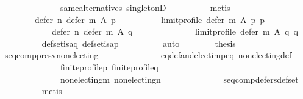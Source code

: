 \begin{isabellebody}
\ \ \ \ \ \ \ \ \ \ \ \ \ \ same{\isacharunderscore}{\kern0pt}alternatives\ singletonD\isanewline
\ \ \ \ \ \ \ \ \isamarkupfalse%
\ metis\isanewline
\ \ \ \ \ \ \isamarkupfalse%
\isanewline
\ \ \ \ \ \ \ \ {\isachardoublequoteopen}defer\ n\ {\isacharparenleft}{\kern0pt}defer\ m\ A\ p{\isacharparenright}{\kern0pt}\isanewline
\ \ \ \ \ \ \ \ \ \ {\isacharparenleft}{\kern0pt}limit{\isacharunderscore}{\kern0pt}profile\ {\isacharparenleft}{\kern0pt}defer\ m\ A\ p{\isacharparenright}{\kern0pt}\ p{\isacharparenright}{\kern0pt}\ {\isacharequal}{\kern0pt}\isanewline
\ \ \ \ \ \ \ \ \ \ \ \ defer\ n\ {\isacharparenleft}{\kern0pt}defer\ m\ A\ q{\isacharparenright}{\kern0pt}\isanewline
\ \ \ \ \ \ \ \ \ \ \ \ \ \ {\isacharparenleft}{\kern0pt}limit{\isacharunderscore}{\kern0pt}profile\ {\isacharparenleft}{\kern0pt}defer\ m\ A\ q{\isacharparenright}{\kern0pt}\ q{\isacharparenright}{\kern0pt}{\isachardoublequoteclose}\isanewline
\ \ \ \ \ \ \ \ \isamarkupfalse%
\ def{\isacharunderscore}{\kern0pt}set{\isacharunderscore}{\kern0pt}is{\isacharunderscore}{\kern0pt}a{\isacharunderscore}{\kern0pt}q\ def{\isacharunderscore}{\kern0pt}set{\isacharunderscore}{\kern0pt}is{\isacharunderscore}{\kern0pt}a{\isacharunderscore}{\kern0pt}p\isanewline
\ \ \ \ \ \ \ \ \isamarkupfalse%
\ auto\isanewline
\ \ \ \ \ \ \isamarkupfalse%
\ {\isacharquery}{\kern0pt}thesis\isanewline
\ \ \ \ \ \ \ \ \isamarkupfalse%
\ seq{\isacharunderscore}{\kern0pt}comp{\isacharunderscore}{\kern0pt}presv{\isacharunderscore}{\kern0pt}non{\isacharunderscore}{\kern0pt}electing\isanewline
\ \ \ \ \ \ \ \ \ \ \ \ \ \ eq{\isacharunderscore}{\kern0pt}def{\isacharunderscore}{\kern0pt}and{\isacharunderscore}{\kern0pt}elect{\isacharunderscore}{\kern0pt}imp{\isacharunderscore}{\kern0pt}eq\ non{\isacharunderscore}{\kern0pt}electing{\isacharunderscore}{\kern0pt}def\isanewline
\ \ \ \ \ \ \ \ \ \ \ \ \ \ finite{\isacharunderscore}{\kern0pt}profile{\isacharunderscore}{\kern0pt}p\ finite{\isacharunderscore}{\kern0pt}profile{\isacharunderscore}{\kern0pt}q\isanewline
\ \ \ \ \ \ \ \ \ \ \ \ \ \ non{\isacharunderscore}{\kern0pt}electing{\isacharunderscore}{\kern0pt}m\ non{\isacharunderscore}{\kern0pt}electing{\isacharunderscore}{\kern0pt}n\isanewline
\ \ \ \ \ \ \ \ \ \ \ \ \ \ seq{\isacharunderscore}{\kern0pt}comp{\isacharunderscore}{\kern0pt}defers{\isacharunderscore}{\kern0pt}def{\isacharunderscore}{\kern0pt}set\isanewline
\ \ \ \ \ \ \ \ \isamarkupfalse%
\ metis\isanewline
\ \ \ \ \isamarkupfalse%
\isanewline
\ \ \isamarkupfalse%
\isanewline
{}\isamarkupfalse%
%
\endisatagproof
{\isafoldproof}%
%
\isadelimproof
\isanewline
%
\endisadelimproof
%
\isadelimtheory
\isanewline
%
\endisadelimtheory
%
\isatagtheory
{}\isamarkupfalse%
%
\endisatagtheory
{\isafoldtheory}%
%
\isadelimtheory
%
\endisadelimtheory
%
\end{isabellebody}%
